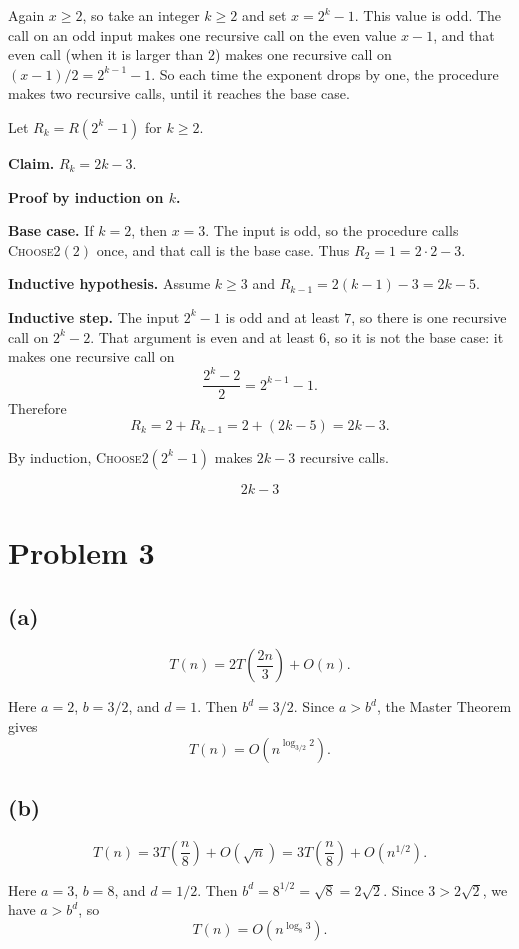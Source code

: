 \documentclass[11pt]{article}
\begin{document}
Again $x\ge 2$, so take an integer $k\ge 2$ and set $x=2^{k}-1$. This value is odd. The call on an odd input makes one recursive call on the even value $x-1$, and that even call (when it is larger than $2$) makes one recursive call on $(x-1)/2=2^{k-1}-1$. So each time the exponent drops by one, the procedure makes two recursive calls, until it reaches the base case.

Let $R_{k}=R(2^{k}-1)$ for $k\ge 2$.

\textbf{Claim.} $R_{k}=2k-3$.

\textbf{Proof by induction on $k$.}

\textbf{Base case.} If $k=2$, then $x=3$. The input is odd, so the procedure calls \textsc{Choose2}$(2)$ once, and that call is the base case. Thus $R_{2}=1=2\cdot 2-3$.

\textbf{Inductive hypothesis.} Assume $k\ge 3$ and $R_{k-1}=2(k-1)-3=2k-5$.

\textbf{Inductive step.} The input $2^{k}-1$ is odd and at least $7$, so there is one recursive call on $2^{k}-2$. That argument is even and at least $6$, so it is not the base case: it makes one recursive call on
\[
\frac{2^{k}-2}{2}=2^{k-1}-1.
\]
Therefore
\[
R_{k}=2+R_{k-1}=2+(2k-5)=2k-3.
\]

By induction, \textsc{Choose2}$(2^{k}-1)$ makes $2k-3$ recursive calls.

\[
\boxed{2k-3}
\]

\section*{Problem 3}

\subsection*{(a)}

\[
T(n)=2T\!\left(\frac{2n}{3}\right)+O(n).
\]

Here $a=2$, $b=3/2$, and $d=1$. Then $b^{d}=3/2$. Since $a>b^{d}$, the Master Theorem gives
\[
T(n)=O\!\left(n^{\log_{3/2}2}\right).
\]

\subsection*{(b)}

\[
T(n)=3T\!\left(\frac{n}{8}\right)+O(\sqrt{n})=3T\!\left(\frac{n}{8}\right)+O(n^{1/2}).
\]

Here $a=3$, $b=8$, and $d=1/2$. Then $b^{d}=8^{1/2}=\sqrt{8}=2\sqrt{2}$. Since $3>2\sqrt{2}$, we have $a>b^{d}$, so
\[
T(n)=O\!\left(n^{\log_{8}3}\right).
\]
\end{document}
